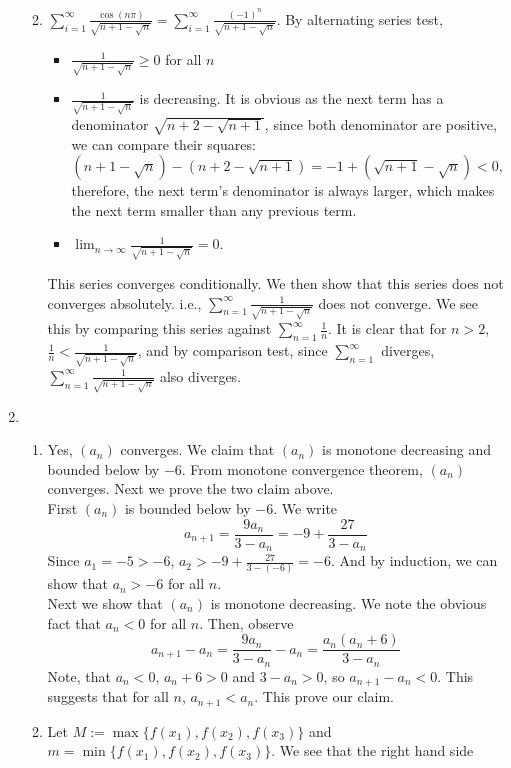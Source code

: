 \documentclass[12pt]{article}
\theoremstyle{definition}
\begin{document}
\begin{enumerate}
\begin{enumerate}
\begin{enumerate}
  \end{enumerate}
  \item $\sum_{i=1}^\infty\frac{\cos(n\pi)}{\sqrt{n+1-\sqrt{n}}}=\sum_{i=1}^\infty\frac{(-1)^n}{\sqrt{n+1-\sqrt{n}}}$. By alternating series test,
  \begin{itemize}
    \item $\frac{1}{\sqrt{n+1-\sqrt{n}}}\geq 0$ for all $n$
    \item $\frac{1}{\sqrt{n+1-\sqrt{n}}}$ is decreasing. It is obvious as the next term has a denominator $\sqrt{n+2-\sqrt{n+1}}$, since both denominator are positive, we can compare their squares: $(n+1-\sqrt{n})-(n+2-\sqrt{n+1})=-1+(\sqrt{n+1}-\sqrt{n})<0$, therefore, the next term's denominator is always larger, which makes the next term smaller than any previous term.
    \item $\lim_{n\to\infty}\frac{1}{\sqrt{n+1-\sqrt{n}}}=0$.
  \end{itemize}
  This series converges conditionally. We then show that this series does not converges absolutely. i.e., $\sum_{n=1}^\infty \frac{1}{\sqrt{n+1-\sqrt{n}}}$ does not converge. We see this by comparing this series against $\sum_{n=1}^\infty \frac{1}{n}$. It is clear that for $n>2$, $\frac{1}{n}<\frac{1}{\sqrt{n+1-\sqrt{n}}}$, and by comparison test, since $\sum_{n=1}^\infty$ diverges, $\sum_{n=1}^\infty \frac{1}{\sqrt{n+1-\sqrt{n}}}$ also diverges.
  \end{enumerate}
  \item \begin{enumerate} \item Yes, $(a_n)$ converges. We claim that $(a_n)$ is monotone decreasing and bounded below by $-6$. From monotone convergence theorem, $(a_n)$ converges. Next we prove the two claim above.\\First $(a_n)$ is bounded below by $-6$. We write
  \[
a_{n+1}=\frac{9a_n}{3-a_n}=-9+\frac{27}{3-a_n}
  \]
  Since $a_1=-5>-6$, $a_2>-9+\frac{27}{3-(-6)}=-6$. And by induction, we can show that $a_n>-6$ for all $n$.\\Next we show that $(a_n)$ is monotone decreasing. We note the obvious fact that $a_n<0$ for all $n$. Then, observe
  \[
a_{n+1}-a_n = \frac{9a_n}{3-a_n}-a_n = \frac{a_n(a_n+6)}{3-a_n}
  \]
  Note, that $a_n<0$, $a_n+6>0$ and $3-a_n>0$, so $a_{n+1}-a_n<0$. This suggests that for all $n$, $a_{n+1}<a_n$. This prove our claim.
  \item Let $M:=\max\{f(x_1),f(x_2),f(x_3)\}$ and $m=\min\{f(x_1),f(x_2),f(x_3)\}$. We see that the right hand side

\end{enumerate}
\end{enumerate}
\end{document}
